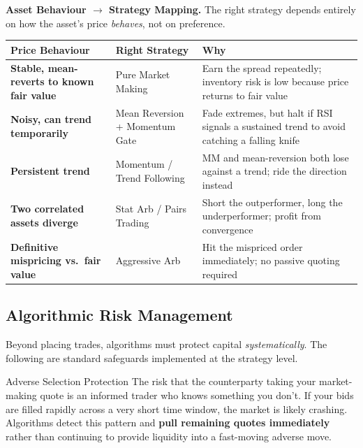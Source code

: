 \begin{notebox}
\textbf{Asset Behaviour $\to$ Strategy Mapping.}
The right strategy depends entirely on how the asset's price \emph{behaves},
not on preference.

\begin{center}
\begin{tabular}{>{\bfseries}p{4cm} p{3.5cm} p{5.5cm}}
\toprule
Price Behaviour & Right Strategy & Why \\
\midrule
Stable, mean-reverts to known fair value &
  Pure Market Making &
  Earn the spread repeatedly; inventory risk is low because price returns to fair value \\
Noisy, can trend temporarily &
  Mean Reversion + Momentum Gate &
  Fade extremes, but halt if RSI signals a sustained trend to avoid catching a falling knife \\
Persistent trend &
  Momentum / Trend Following &
  MM and mean-reversion both lose against a trend; ride the direction instead \\
Two correlated assets diverge &
  Stat Arb / Pairs Trading &
  Short the outperformer, long the underperformer; profit from convergence \\
Definitive mispricing vs.\ fair value &
  Aggressive Arb &
  Hit the mispriced order immediately; no passive quoting required \\
\bottomrule
\end{tabular}
\end{center}
\end{notebox}

\subsection{Algorithmic Risk Management}

Beyond placing trades, algorithms must protect capital \emph{systematically}. The
following are standard safeguards implemented at the strategy level.

\begin{keyterm}{Adverse Selection Protection}
The risk that the counterparty taking your market-making quote is an informed trader
who knows something you don't. If your bids are filled rapidly across a very short
time window, the market is likely crashing.
Algorithms detect this pattern and \textbf{pull remaining quotes immediately} rather
than continuing to provide liquidity into a fast-moving adverse move.
\end{keyterm}

